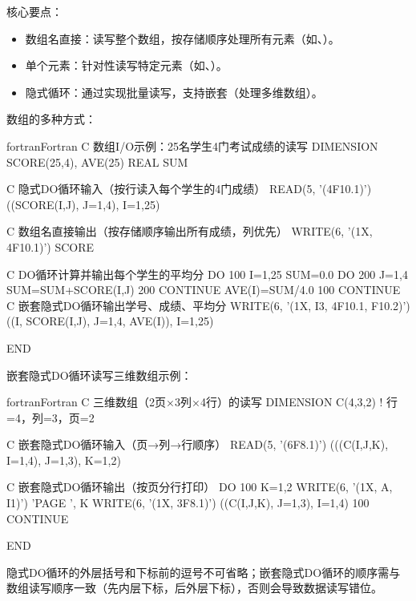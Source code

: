 核心要点：
\begin{itemize}
      \item 数组名直接：读写整个数组，按存储顺序处理所有元素（如、）。
      \item 单个元素：针对性读写特定元素（如、）。
      \item 隐式循环：通过实现批量读写，支持嵌套（处理多维数组）。
\end{itemize}

数组的多种方式：
\begin{envcode}{fortran}{Fortran}
C 数组I/O示例：25名学生4门考试成绩的读写
      DIMENSION SCORE(25,4), AVE(25)
      REAL SUM
      
C 隐式DO循环输入（按行读入每个学生的4门成绩）
      READ(5, '(4F10.1)') ((SCORE(I,J), J=1,4), I=1,25)
      
C 数组名直接输出（按存储顺序输出所有成绩，列优先）
      WRITE(6, '(1X, 4F10.1)') SCORE
      
C DO循环计算并输出每个学生的平均分
      DO 100 I=1,25
          SUM=0.0
          DO 200 J=1,4
              SUM=SUM+SCORE(I,J)
200       CONTINUE
          AVE(I)=SUM/4.0
100   CONTINUE
C 嵌套隐式DO循环输出学号、成绩、平均分
      WRITE(6, '(1X, I3, 4F10.1, F10.2)') ((I, SCORE(I,J), J=1,4, AVE(I)), I=1,25)
      
      END
\end{envcode}

嵌套隐式DO循环读写三维数组示例：
\begin{envcode}{fortran}{Fortran}
C 三维数组（2页×3列×4行）的读写
      DIMENSION C(4,3,2)  ! 行=4，列=3，页=2
      
C 嵌套隐式DO循环输入（页→列→行顺序）
      READ(5, '(6F8.1)') (((C(I,J,K), I=1,4), J=1,3), K=1,2)
      
C 嵌套隐式DO循环输出（按页分行打印）
      DO 100 K=1,2
          WRITE(6, '(1X, A, I1)') 'PAGE ', K
          WRITE(6, '(1X, 3F8.1)') ((C(I,J,K), J=1,3), I=1,4)
100   CONTINUE
      
      END
\end{envcode}

隐式DO循环的外层括号和下标前的逗号不可省略；嵌套隐式DO循环的顺序需与数组读写顺序一致（先内层下标，后外层下标），否则会导致数据读写错位。








